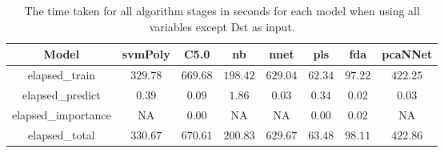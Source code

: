 \begin{table}[!ht]
	\centering
	\begin{tabular}{|c|c|c|c|c|c|c|c|}
		\hline
		Model & svmPoly & C5.0 & nb & nnet & pls & fda & pcaNNet \\ \hline
		elapsed_train & $329.78$ & $669.68$ & $198.42$ & $629.04$ & $62.34$ & $97.22$ & $422.25$ \\ \hline
		elapsed_predict & $0.39$ & $0.09$ & $1.86$ & $0.03$ & $0.34$ & $0.02$ & $0.03$ \\ \hline
		elapsed_importance & NA & $0.00$ & NA & NA & $0.00$ & $0.02$ & NA \\ \hline
		elapsed_total & $330.67$ & $670.61$ & $200.83$ & $629.67$ & $63.48$ & $98.11$ & $422.86$ \\ \hline
	\end{tabular}
	\caption{The time taken for all algorithm stages in seconds for each model when using all variables except Dst as input.}
	\label{tab:time:reverse:noDst}
\end{table}
